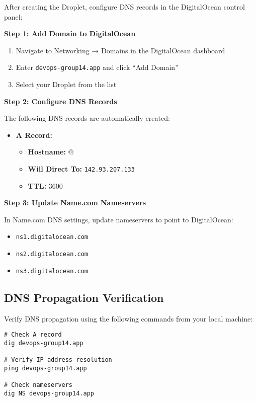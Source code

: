 After creating the Droplet, configure DNS records in the DigitalOcean control panel:

\textbf{Step 1: Add Domain to DigitalOcean}
\begin{enumerate}
    \item Navigate to Networking → Domains in the DigitalOcean dashboard
    \item Enter \texttt{devops-group14.app} and click ``Add Domain''
    \item Select your Droplet from the list
\end{enumerate}

\textbf{Step 2: Configure DNS Records}

The following DNS records are automatically created:
\begin{itemize}
    \item \textbf{A Record:}
    \begin{itemize}
        \item \textbf{Hostname:} @
        \item \textbf{Will Direct To:} \texttt{142.93.207.133}
        \item \textbf{TTL:} 3600
    \end{itemize}
\end{itemize}

\textbf{Step 3: Update Name.com Nameservers}

In Name.com DNS settings, update nameservers to point to DigitalOcean:
\begin{itemize}
    \item \texttt{ns1.digitalocean.com}
    \item \texttt{ns2.digitalocean.com}
    \item \texttt{ns3.digitalocean.com}
\end{itemize}

\subsection{DNS Propagation Verification}

Verify DNS propagation using the following commands from your local machine:

\begin{verbatim}
# Check A record
dig devops-group14.app

# Verify IP address resolution
ping devops-group14.app

# Check nameservers
dig NS devops-group14.app
\end{verbatim}

